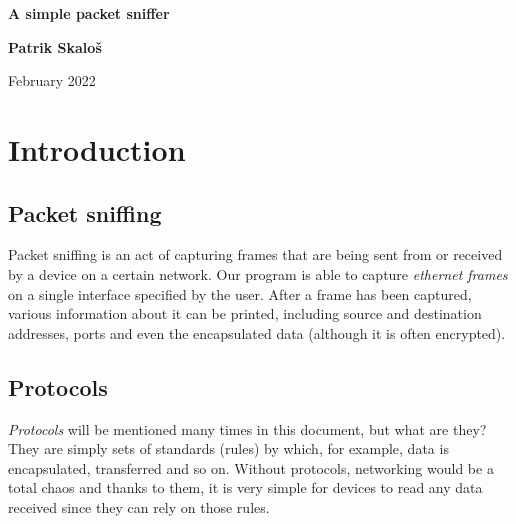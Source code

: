 \documentclass[a4paper]{article}
\begin{document}
  \begin{titlepage}
    \begin{center}

      \vspace*{5cm}

      \huge
      \textbf{A simple packet sniffer}
      
      \vspace{2cm}

      \huge
      \textbf{Patrik Skaloš}

      \vfill

      February 2022

    \end{center}
  \end{titlepage}


  \tableofcontents


  \newpage

  \section{Introduction}

  \subsection{Packet sniffing}

  Packet sniffing is an act of capturing frames that are being sent from or 
  received by a device on a certain network. Our program is able to capture 
  \textit{ethernet frames} on a single interface specified by the user.
  After a frame has been captured, various information about it can be printed, 
  including source and destination addresses, ports and even the encapsulated 
  data (although it is often encrypted).


  \subsection{Protocols}

  \textit{Protocols} will be mentioned many times in this document, but what 
  are they? They are simply sets of standards (rules) by which, for example, 
  data is encapsulated, transferred and so on. Without protocols, networking 
  would be a total chaos and thanks to them, it is very simple for devices to 
  read any data received since they can rely on those rules.
\end{document}
